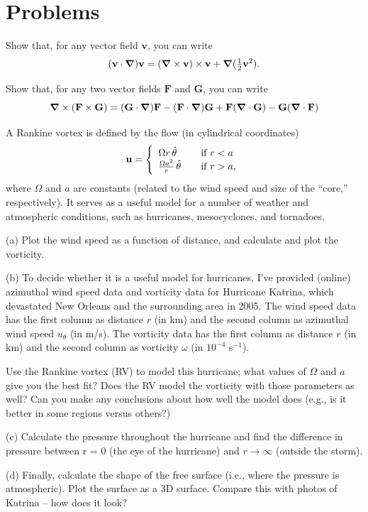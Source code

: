 \section*{Problems}

\begin{problem}
\label{prob_vc3}
Show that, for any vector field $\mathbf{v}$, you can write
\[
(\mathbf{v} \cdot \boldsymbol{\nabla} ) \mathbf{v} = (\boldsymbol{\nabla} \times \mathbf{v}) \times \mathbf{v} + \boldsymbol{\nabla}(\tfrac{1}{2} \mathbf{v}^2).
\]
\end{problem}

\begin{problem}
\label{prob_vc4}
Show that, for any two vector fields $\mathbf{F}$ and $\mathbf{G}$, you can write
\[
\boldsymbol{\nabla} \times (\mathbf{F} \times \mathbf{G}) = (\mathbf{G} \cdot \boldsymbol{\nabla}) \mathbf{F} - (\mathbf{F} \cdot \boldsymbol{\nabla}) \mathbf{G} + \mathbf{F} (\boldsymbol{\nabla} \cdot \mathbf{G}) - \mathbf{G} (\boldsymbol{\nabla} \cdot \mathbf{F})
\]
\end{problem}


\begin{problem}
A Rankine vortex is defined by the flow (in cylindrical coordinates)
\[
\mathbf{u}  = \left\{
 \begin{array}{l l}
    \Omega r \, \hat{\theta} & \quad \text{if $r < a$}\\
   \frac{\Omega a^2}{r} \, \hat{\theta} & \quad \text{if $r>a$,}
  \end{array} \right.
\]
where $\Omega$ and $a$ are constants (related to the wind speed and size of the ``core,'' respectively).  It serves as a useful model for a number of weather and atmospheric conditions, such as hurricanes, mesocyclones, and tornadoes.  

(a) Plot the wind speed as a function of distance, and calculate and plot the vorticity.

(b) To decide whether it is a useful model for hurricanes, I've provided (online) azimuthal wind speed data and vorticity data for Hurricane Katrina, which devastated New Orleans and the surrounding area in 2005.  The wind speed data has the first column as distance $r$ (in km) and the second column as azimuthal wind speed $u_\theta$ (in m/s).  The vorticity data has the first column as distance $r$ (in km) and the second column as vorticity $\omega$ (in $10^{-4}$ s$^{-1}$).

Use the Rankine vortex (RV) to model this hurricane; what values of $\Omega$ and $a$ give you the best fit?  Does the RV model the vorticity with those parameters as well?  Can you make any conclusions about how well the model does (e.g., is it better in some regions versus others?)

(c) Calculate the pressure throughout the hurricane and find the difference in pressure between r = 0 (the eye of the hurricane) and $r \to \infty$ (outside the storm).

(d) Finally, calculate the shape of the free surface (i.e., where the pressure is atmospheric). Plot the surface as a 3D surface. Compare this with photos of Katrina -- how does it look?
\end{problem}



